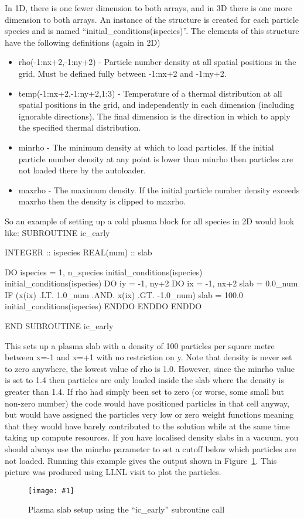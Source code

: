\documentclass[12pt,a4paper]{article}
\newcommand{\scaledcapimage}[4]
  {{\begin{figure}[hbt!]\centering\texttt{[image: \#1]}\caption{#3}
    \label{#2} \end{figure}}}
\newenvironment{boxverbatim}{\lboxverbatim{none}}{\endlboxverbatim}
\begin{document}
In 1D, there is one fewer dimension to both arrays, and in 3D there is one
more dimension to both arrays. An instance of the structure is created for
each particle species and is named ``initial\_conditions(ispecies)''. The
elements of this structure have the following definitions (again in 2D)\\
\begin{itemize}
\item rho(-1:nx+2,-1:ny+2) - Particle number density at all spatial
  positions in the grid. Must be defined fully between -1:nx+2 and -1:ny+2.
\item temp(-1:nx+2,-1:ny+2,1:3) - Temperature of a thermal distribution at all
  spatial positions in the grid, and independently in each dimension
  (including ignorable directions). The final dimension is the direction in
  which to apply the specified thermal distribution.
\item minrho - The minimum density at which to load particles. If the initial
  particle number density at any point is lower than minrho then particles are
  not loaded there by the autoloader.
\item maxrho - The maximum density. If the initial particle number density
  exceeds maxrho then the density is clipped to maxrho.
\end{itemize}

So an example of setting up a cold plasma block for all species in 2D would
look like:
\begin{boxverbatim}
SUBROUTINE ic_early

  INTEGER :: ispecies
  REAL(num) :: slab

  DO ispecies = 1, n_species
    initial_conditions(ispecies)%
    initial_conditions(ispecies)%
    DO iy = -1, ny+2
      DO ix = -1, nx+2
        slab = 0.0_num
        IF (x(ix) .LT. 1.0_num .AND. x(ix) .GT. -1.0_num) slab = 100.0
        initial_conditions(ispecies)%
      ENDDO
    ENDDO
  ENDDO

END SUBROUTINE ic_early
\end{boxverbatim}

This sets up a plasma slab with a density of 100 particles per square metre
between x=-1 and x=+1 with no restriction on y. Note that density is never set
to zero anywhere, the lowest value of rho is 1.0. However, since the minrho
value is set to 1.4 then particles are only loaded inside the slab where the
density is greater than 1.4. If rho had simply been set to zero (or worse,
some small but non-zero number) the code would have positioned particles in
that cell anyway, but would have assigned the particles very low or zero
weight functions meaning that they would have barely contributed to the
solution while at the same time taking up compute resources. If you have
localised density slabs in a vacuum, you should always use the minrho
parameter to set a cutoff below which particles are not loaded. Running this
example gives the output shown in Figure~\ref{slab}. This picture was produced
using LLNL visit to plot the particles.\\
\scaledcapimage{./images/example}{slab}{Plasma slab setup using the
  ``ic\_early'' subroutine call}{0.4}
\end{document}
